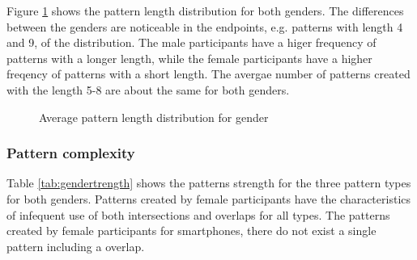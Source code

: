     Figure \ref{fig:avgpatterndistgender} shows the pattern length distribution for both genders. The differences between the genders are noticeable in the endpoints, e.g. patterns with length 4 and 9, of the distribution. The male participants have a higer frequency of patterns with a longer length, while the female participants have a higher freqency of patterns with a short length. The avergae number of patterns created with the length 5-8 are about the same for both genders. 

    \begin{figure}[H]
    	\centering
    	\caption{Average pattern length distribution for gender}
    	\label{fig:avgpatterndistgender}
    \end{figure}

    \subsubsection{Pattern complexity}

    Table \ref{tab:gendertrength} shows the patterns strength for the three pattern types for both genders. Patterns created by female participants have the characteristics of infequent use of both intersections and overlaps for all types. The patterns created by female participants for smartphones, there do not exist a single pattern including a overlap.

